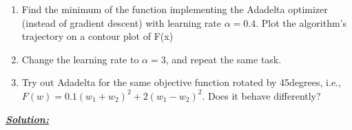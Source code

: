 \documentclass{article}
\begin{document}
\begin{enumerate}
    \item Find the minimum of the function implementing the Adadelta optimizer (instead of
            gradient descent) with learning rate $\alpha = 0.4$. Plot the algorithm’s trajectory on a contour
            plot of F(x)
    \item Change the learning rate to $\alpha = 3$, and repeat the same task.
    \item Try out Adadelta for the same objective function rotated by 45degrees, i.e., 
            $ F(w) = 0.1(w_1+w_2)^2 + 2(w_1-w_2)^2$. Does it behave differently?\\ 
\end{enumerate} 

\noindent \underline{\textbf{\textit{Solution:}}} 
\end{document}
